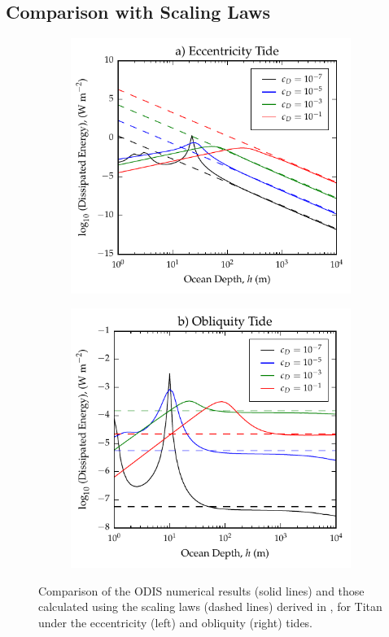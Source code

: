 \subsection{Comparison with Scaling Laws \label{subsec:scalTitan}}

\begin{figure}[!t]
\centering
\begin{subfigure}{0.5\linewidth}
\centering
\includegraphics[width=0.85\linewidth]{Figures/Eccentricity_scaling}
\subcaption{\label{fig:scalEccTitan}}
\end{subfigure}%
\begin{subfigure}{0.5\linewidth}
\centering
\includegraphics[width=0.85\linewidth]{Figures/Obliquity_scaling}
\subcaption{\label{fig:scalObliqTitan}}
\end{subfigure}
\vspace*{-0.8cm}
\caption{Comparison of the ODIS numerical results (solid lines) and those calculated using the scaling laws (dashed lines) derived in \citet{chen2013tidal}, for Titan under the eccentricity (left) and obliquity (right) tides.\label{fig:scalTitan}}
\end{figure}

